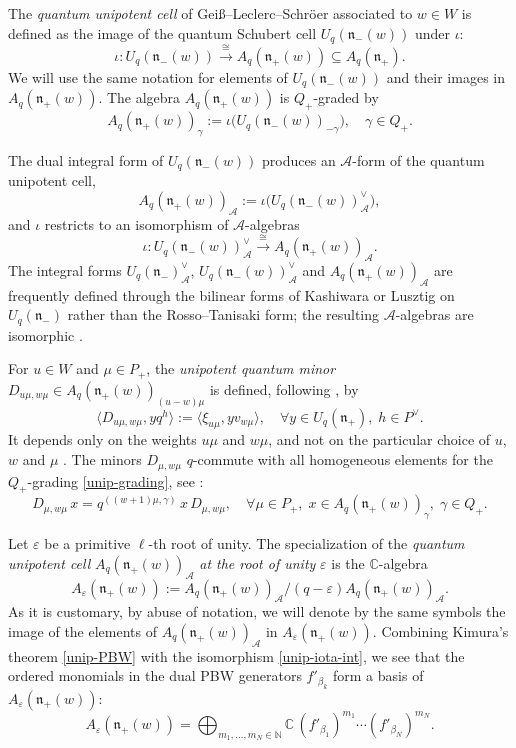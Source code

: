 \documentclass[11pt]{amsart}
\theoremstyle{plain}
\def \Cset {{\mathbb C}}
\def \Nset {{\mathbb N}}
\def \cA {\mathcal{A}}
\def \be {\beta}
\def \ep {\varepsilon}
\def \n  {\mathfrak{n}}
\begin{document}
The {\em{quantum unipotent cell}} of Gei\ss--Leclerc--Schr\"oer associated to $w \in W$ is defined as the image of the quantum Schubert cell $U_q(\n_-(w))$ under $\iota$:
\[
\iota : U_q(\n_-(w)) \stackrel{\cong}{\longrightarrow} A_q(\n_+(w)) \subseteq A_q(\n_+).
\]
We will use the same notation for elements of $U_q(\n_-(w))$ and their images in $A_q(\n_+(w))$. 
The algebra $A_q(\n_+(w))$ is $Q_+$-graded by 
\begin{equation}
\label{unip-grading}
A_q(\n_+(w))_\gamma := \iota \big( U_q(\n_-(w))_{-\gamma} \big), \quad \gamma \in Q_+.
\end{equation}

The dual integral form of $U_q(\n_-(w))$ produces an $\cA$-form of the quantum unipotent cell,
\[
A_q(\n_+(w))_{\cA} := \iota \big( U_q(\n_-(w))^\vee_{\cA} \big),
\]
and $\iota$ restricts to an isomorphism of $\cA$-algebras
\[
\iota : U_q(\n_-(w))^\vee_{\cA} \stackrel{\cong}{\longrightarrow} A_q(\n_+(w))_{\cA}.
\]
The integral forms $U_q(\n_-)^\vee_{\cA}$, $U_q(\n_-(w))^\vee_{\cA}$ and $A_q(\n_+(w))_{\cA}$ are frequently defined through the bilinear forms of Kashiwara \cite{Kas91} or Lusztig \cite{Lus93} on $U_q(\n_-)$ rather than the Rosso--Tanisaki form; the resulting $\cA$-algebras are isomorphic \cite[Remark 5.3]{GY2}.

For $u \in W$ and $\mu \in P_+$, the {\em{unipotent quantum minor}} $D_{u\mu, w\mu} \in A_q(\n_+(w))_{(u-w)\mu}$ is defined, following \cite{GLS}, by 
\[
\langle D_{u\mu, w\mu}, y q^h \rangle := \langle \xi_{u\mu}, y v_{w\mu} \rangle, \quad \forall y \in U_q(\n_+), \; h \in P^\vee.
\]
It depends only on the weights $u\mu$ and $w\mu$, and not on the particular choice of $u$, $w$ and $\mu$ \cite[Sect. 9.3]{BerZe}. The minors $D_{\mu, w\mu}$ $q$-commute with all homogeneous elements for the $Q_+$-grading \eqref{unip-grading}, see \cite[Eq. (6.9)]{GY2}:
\begin{equation}
\label{unip-qcomm}
D_{\mu, w\mu} \, x = q^{((w+1)\mu, \gamma)} \, x \, D_{\mu, w\mu}, \quad 
\forall \mu \in P_+, \; x \in A_q(\n_+(w))_\gamma, \; \gamma \in Q_+.
\end{equation}

Let $\ep$ be a primitive $\ell$-th root of unity. The specialization of the {\em{quantum unipotent cell}} $A_q(\n_+(w))_{\cA}$ {\em{at the root of unity}} $\ep$ is
the $\Cset$-algebra
\[
A_\ep(\n_+(w)) := A_q(\n_+(w))_{\cA} / (q - \ep) A_q(\n_+(w))_{\cA}.
\]
As it is customary, by abuse of notation, we will denote by the same symbols the image of the elements of 
$A_q(\n_+(w))_{\cA}$ in $A_\ep(\n_+(w))$.
Combining Kimura's theorem \eqref{unip-PBW} with the isomorphism \eqref{unip-iota-int}, we see that the ordered monomials in the dual PBW generators $f'_{\beta_k}$ form a basis of $A_\ep(\n_+(w))$:
\[
A_\ep(\n_+(w)) = \bigoplus_{m_1, \ldots, m_N \in \Nset} \Cset \, (f'_{\be_1})^{m_1} \cdots (f'_{\be_N})^{m_N}.
\]
\end{document}
